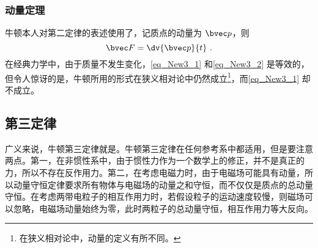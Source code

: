 \subsubsection{动量定理}
牛顿本人对第二定律的表述使用了，记质点的动量为 $\bvec p$，则
\begin{equation}\label{eq_New3_2}
\bvec F = \dv{\bvec p}{t}~.
\end{equation}
在经典力学中，由于质量不发生变化，\autoref{eq_New3_1} 和\autoref{eq_New3_2} 是等效的，但令人惊讶的是，牛顿所用的形式在狭义相对论中仍然成立\footnote{在狭义相对论中，动量的定义有所不同。}，而\autoref{eq_New3_1} 却不成立。

\subsection{第三定律}
广义来说，牛顿第三定律就是。牛顿第三定律在任何参考系中都适用，但是要注意两点。第一，在非惯性系中，由于惯性力作为一个数学上的修正，并不是真正的力，所以不存在反作用力。第二，在考虑电磁力时，由于电磁场可能具有动量，所以动量守恒定律要求所有物体与电磁场的动量之和守恒，而不仅仅是质点的总动量守恒。在考虑两带电粒子的相互作用力时，若假设粒子的运动速度较慢，则磁场可以忽略，电磁场动量始终为零，此时两粒子的总动量守恒，相互作用力等大反向。
